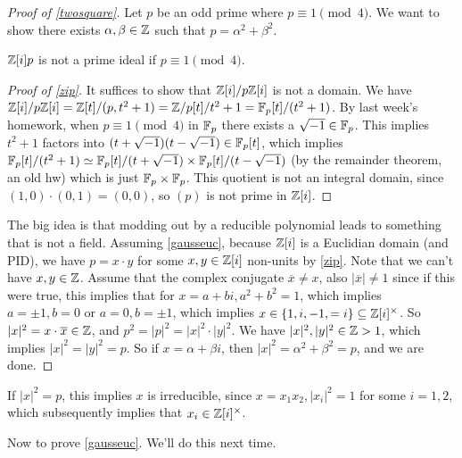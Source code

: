     \begin{proof}[Proof of \cref{twosquare}]
       Let $p$ be an odd prime where $p \equiv 1\pmod 4$. We want to show there exists $\alpha ,\beta  \in \mathbb{Z}$ such that $p=\alpha ^2+\beta ^2$.
       \begin{lemma}\label{zip} 
           $\mathbb{Z}[i]p$ is not a prime ideal if $p\equiv 1 \pmod 4$.
       \end{lemma}
       \begin{proof}[Proof of \cref{zip}]
           It suffices to show that $\mathbb{Z}[i]/ p \mathbb{Z}[i]$ is not a domain. We have $\mathbb{Z}[i] / p \mathbb{Z}[i] = \mathbb{Z}[t] / (p, t^2+1)=\mathbb{Z} / p[t] / t^2+1 = \mathbb{F}_p[t] / (t^2+1)$. By last week's homework, when $p\equiv 1 \pmod 4$ in $\mathbb{F}_p$ there exists a $\sqrt{-1} \in \mathbb{F}_p$. This implies $t^2+1$ factors into $(t + \sqrt{-1} )(t- \sqrt{-1} ) \in \mathbb{F}_p [t]$, which implies $\mathbb{F}_p[t] / (t^2+1) \simeq  \mathbb{F}_p[t] / (t+ \sqrt{-1} ) \times  \mathbb{F}_p [t] / (t - \sqrt{-1} )$ (by the remainder theorem, an old hw) which is just $\mathbb{F}_p \times  \mathbb{F}_p$. This quotient is not an integral domain, since $(1,0)\cdot (0,1)=(0,0)$, so $(p)$ is not prime in $\mathbb{Z}[i]$. 
       \end{proof}
       The big idea is that modding out by a reducible polynomial leads to something that is not a field. Assuming \cref{gausseuc}, because $\mathbb{Z}[i]$ is a Euclidian domain (and PID), we have $p= x \cdot y$ for some $x,y \in \mathbb{Z}[i]$ non-units by \cref{zip}. Note that we can't have $x,y \in \mathbb{Z}$. Assume that the complex conjugate $\overline{x}\neq x$, also $| \overline{x}|\neq 1$ since if this were true, this implies that for $x=a+bi, a^2+b^2=1$, which implies $a=\pm 1,b=0$ or $a=0,b=\pm 1$, which implies $x \in  \{1, i , -1 , =i\} \subseteq  \mathbb{Z}[i] ^{\times }$. So $|x |^2= x \cdot  \overline{x} \in \mathbb{Z}$, and $p^2 = |p|^2=|x|^2 \cdot |y|^2$. We have $|x|^2,|y|^2 \in \mathbb{Z}>1$, which implies $|x|^2=|y|^2=p$. So if $x=\alpha +\beta i$, then $|x|^2=\alpha ^2+\beta ^2=p$, and we are done.
    \end{proof}
    \begin{remark}
        If $|x|^2=p$, this implies $x$ is irreducible, since $x=x_1x_2, |x_i |^2=1$ for some $i=1,2$, which subsequently implies that $x_i  \in \mathbb{Z}[i] ^{\times }$.
    \end{remark}
    Now to prove \cref{gausseuc}. We'll do this next time.
